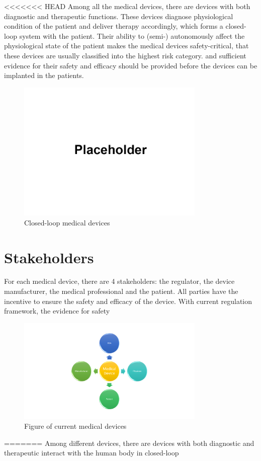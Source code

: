 <<<<<<< HEAD
Among all the medical devices, there are devices with both diagnostic and therapeutic functions. These devices diagnose physiological condition of the patient and deliver therapy accordingly, which forms a closed-loop system with the patient. Their ability to (semi-) autonomously affect the physiological state of the patient makes the medical devices safety-critical, that these devices are usually classified into the highest risk category. and sufficient evidence for their safety and efficacy should be provided before the devices can be implanted in the patients.
\begin{figure}[t]
		\centering
		\includegraphics[width=0.8\textwidth]{figs/placeholder.png}
		\caption{\small Closed-loop medical devices}
		\label{fig:closed-loop}
\end{figure}
\section{Stakeholders}
For each medical device, there are 4 stakeholders: the regulator, the device manufacturer, the medical professional and the patient. All parties have the incentive to ensure the safety and efficacy of the device. With current regulation framework, the evidence for safety 
\begin{figure}[t]
		\centering
		\includegraphics[width=0.8\textwidth]{figs/stakeholders.pdf}
		\caption{\small Figure of current medical devices}
		\label{fig:Cur}
\end{figure}
=======
Among different devices, there are devices with both diagnostic and therapeutic interact with the human body in closed-loop



